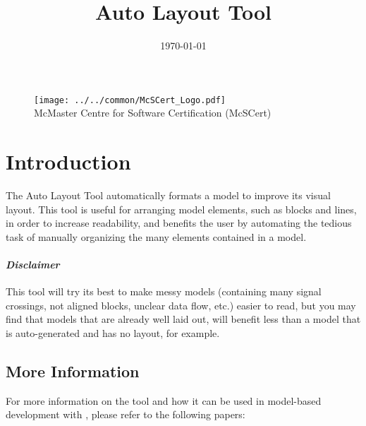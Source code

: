\documentclass{article}
\makeatletter
\newcommand{\ToolName}{Auto Layout Tool\@\xspace}
\makeatother
\begin{document}
\title{\ToolName}
\date{\monthyeardate\today}
\maketitle
\vfill

\begin{figure}
	\centering
	\texttt{[image: ../../common/McSCert\_Logo.pdf]} \\
	McMaster Centre for Software Certification (McSCert)
\end{figure}

\newpage

\tableofcontents
\newpage

\section{Introduction}

The \ToolName automatically formats a \Simulink model to improve its visual layout. This tool is useful for arranging \Simulink model elements, such as blocks and lines, in order to increase readability, and benefits the user by automating the tedious task of manually organizing the many elements contained in a model.

\paragraph{\textit{Disclaimer}} This tool will try its best to make messy models (containing many signal crossings, not aligned blocks, unclear data flow, etc.) easier to read, but you may find that models that are already well laid out, will benefit less than a model that is auto-generated and has no layout, for example.

\subsection*{More Information}
For more information on the tool and how it can be used in model-based development with \Simulink, please refer to the following papers:
\end{document}
